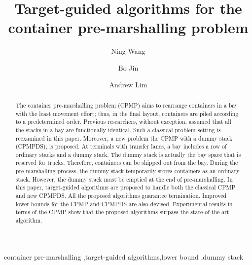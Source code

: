 \documentclass[review,3p,times,authoryear,12pt]{elsarticle}
\begin{document}
\graphicspath{{./figure/}}
\begin{frontmatter}
\newpage

\title{Target-guided algorithms for the container pre-marshalling problem}

\author[shu]{Ning Wang}

\author[cityu]{Bo Jin}

\author[nju]{Andrew Lim}

\address[shu]{
Department of Information Management, School of Management, Shanghai University, Shanghai, China
}

\address[cityu]{
Department of Management Sciences, City University of Hong Kong, Kowloon Tong, Hong Kong
}

\address[nju]{International Center of Management Science and Engineering, School of Management and Engineering, Nanjing University, Nanjing, Jiangsu, China}



\begin{abstract}
The container pre-marshalling problem (CPMP) aims to rearrange containers in a bay with the least movement effort; thus, in the final layout, containers are piled according to a predetermined order.
Previous researchers, without exception, assumed that all the stacks in a bay are functionally identical.
Such a classical problem setting is reexamined in this paper.
Moreover, a new problem the CPMP with a dummy stack (CPMPDS), is proposed.
At terminals with transfer lanes, a bay includes a row of ordinary stacks and a dummy stack.
The dummy stack is actually the bay space that is reserved for trucks.
Therefore, containers can be shipped out from the bay.
During the pre-marshalling process, the dummy stack temporarily stores containers as an ordinary stack.
However, the dummy stack must be emptied at the end of pre-marshalling.
In this paper, target-guided algorithms are proposed to handle both the classical CPMP and new CPMPDS.
All the proposed algorithms guarantee termination.
Improved lower bounds for the CPMP and CPMPDS are also devised.
Experimental results in terms of the CPMP show that the proposed algorithms surpass the state-of-the-art algorithm.
\end{abstract}

\begin{keyword}
container pre-marshalling \sep target-guided algorithms\sep lower bound \sep dummy stack
\end{keyword}
\end{frontmatter}
\end{document}
